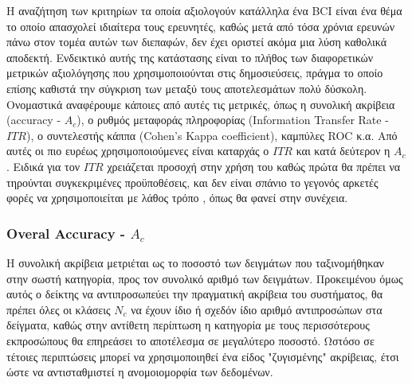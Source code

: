 \documentclass[11pt,a4paper,english,greek,twoside]{../Thesis}
\begin{document}
  \par Η αναζήτηση των κριτηρίων τα οποία αξιολογούν κατάλληλα ένα BCI είναι ένα θέμα το οποίο απασχολεί ιδιαίτερα τους ερευνητές, καθώς μετά από τόσα χρόνια ερευνών πάνω στον τομέα αυτών των διεπαφών, δεν έχει οριστεί ακόμα μια λύση καθολικά αποδεκτή. Ενδεικτικό αυτής της κατάστασης είναι το πλήθος των διαφορετικών μετρικών αξιολόγησης που χρησιμοποιούνται στις δημοσιεύσεις, πράγμα το οποίο επίσης καθιστά την σύγκριση των μεταξύ τους αποτελεσμάτων πολύ δύσκολη. Ονομαστικά αναφέρουμε κάποιες από αυτές τις μετρικές, όπως η συνολική ακρίβεια (accuracy - $A_c$), ο ρυθμός μεταφοράς πληροφορίας (Information Transfer Rate - $ITR$), ο συντελεστής κάππα (Cohen’s Kappa coefficient), καμπύλες ROC κ.α. Από αυτές οι πιο ευρέως χρησιμοποιούμενες είναι καταρχάς ο $ITR$ \cite{McFarland2012-pp} και κατά δεύτερον η $A_c$. Ειδικά για τον $ITR$ χρειάζεται προσοχή στην χρήση του καθώς πρώτα θα πρέπει να τηρούνται συγκεκριμένες προϋποθέσεις, και δεν είναι σπάνιο το γεγονός αρκετές φορές να χρησιμοποιείται με λάθος τρόπο \cite{Yuan2013-jp}, όπως θα φανεί στην συνέχεια.
  
  \subsubsection{Overal Accuracy - $A_c$}
  Η συνολική ακρίβεια μετριέται ως το ποσοστό των δειγμάτων που ταξινομήθηκαν στην σωστή κατηγορία, προς τον συνολικό αριθμό των δειγμάτων. Προκειμένου όμως αυτός ο δείκτης να αντιπροσωπεύει την πραγματική ακρίβεια του συστήματος, θα πρέπει όλες οι κλάσεις $N_c$ να έχουν ίδιο ή σχεδόν ίδιο αριθμό αντιπροσώπων στα δείγματα, καθώς στην αντίθετη περίπτωση η κατηγορία με τους περισσότερους εκπροσώπους θα επηρεάσει το αποτέλεσμα σε μεγαλύτερο ποσοστό. Ωστόσο σε τέτοιες περιπτώσεις μπορεί να χρησιμοποιηθεί ένα είδος "ζυγισμένης" ακρίβειας, έτσι ώστε να αντισταθμιστεί η ανομοιομορφία των δεδομένων.
  
\end{document}
